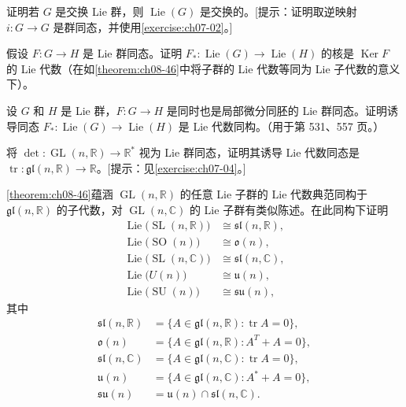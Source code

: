 \documentclass[../../main.tex]{subfiles}
\begin{document}
\begin{exercise}\label{exercise:ch08-25}
证明若 $G$ 是交换 Lie 群，则 $\operatorname{Lie}(G)$ 是交换的。[提示：证明取逆映射 $i\colon G\to G$ 是群同态，并使用\cref{exercise:ch07-02}。]
\end{exercise}

\begin{exercise}\label{exercise:ch08-26}
假设 $F\colon G\to H$ 是 Lie 群同态。证明 $F_*\colon\operatorname{Lie}(G)\to\operatorname{Lie}(H)$ 的核是 $\operatorname{Ker}F$ 的 Lie 代数（在如\cref{theorem:ch08-46}中将子群的 Lie 代数等同为 Lie 子代数的意义下）。
\end{exercise}

\begin{exercise}\label{exercise:ch08-27}
设 $G$ 和 $H$ 是 Lie 群，$F\colon G\to H$ 是同时也是局部微分同胚的 Lie 群同态。证明诱导同态 $F_*\colon\operatorname{Lie}(G)\to\operatorname{Lie}(H)$ 是 Lie 代数同构。（用于第 531、557 页。）
\end{exercise}

\begin{exercise}\label{exercise:ch08-28}
将 $\det\colon\operatorname{GL}(n,\mathbb{R})\to\mathbb{R}^*$ 视为 Lie 群同态，证明其诱导 Lie 代数同态是 $\operatorname{tr}\colon\mathfrak{gl}(n,\mathbb{R})\to\mathbb{R}$。[提示：见\cref{exercise:ch07-04}。]
\end{exercise}

\begin{exercise}\label{exercise:ch08-29}
\cref{theorem:ch08-46}蕴涵 $\operatorname{GL}(n,\mathbb{R})$ 的任意 Lie 子群的 Lie 代数典范同构于 $\mathfrak{gl}(n,\mathbb{R})$ 的子代数，对 $\operatorname{GL}(n,\mathbb{C})$ 的 Lie 子群有类似陈述。在此同构下证明
\begin{align*}
\operatorname{Lie}\bigl(\operatorname{SL}(n,\mathbb{R})\bigr)&\cong\mathfrak{sl}(n,\mathbb{R}),\\
\operatorname{Lie}\bigl(\operatorname{SO}(n)\bigr)&\cong\mathfrak{o}(n),\\
\operatorname{Lie}\bigl(\operatorname{SL}(n,\mathbb{C})\bigr)&\cong\mathfrak{sl}(n,\mathbb{C}),\\
\operatorname{Lie}\bigl(U(n)\bigr)&\cong\mathfrak{u}(n),\\
\operatorname{Lie}\bigl(\operatorname{SU}(n)\bigr)&\cong\mathfrak{su}(n),
\end{align*}
其中
\begin{align*}
\mathfrak{sl}(n,\mathbb{R})&=\{A\in\mathfrak{gl}(n,\mathbb{R}):\operatorname{tr}A=0\},\\
\mathfrak{o}(n)&=\{A\in\mathfrak{gl}(n,\mathbb{R}):A^{T}+A=0\},\\
\mathfrak{sl}(n,\mathbb{C})&=\{A\in\mathfrak{gl}(n,\mathbb{C}):\operatorname{tr}A=0\},\\
\mathfrak{u}(n)&=\{A\in\mathfrak{gl}(n,\mathbb{C}):A^{*}+A=0\},\\
\mathfrak{su}(n)&=\mathfrak{u}(n)\cap\mathfrak{sl}(n,\mathbb{C}).
\end{align*}
\end{exercise}
\end{document}
